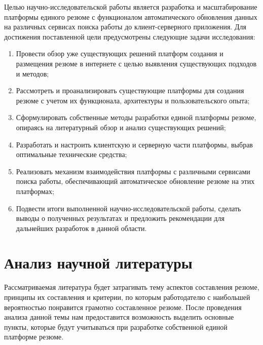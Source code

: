 \documentclass[master, och, diploma]{SCWorks}
\begin{document}
Целью научно-исследовательской работы является разработка и масштабирование платформы единого резюме с функционалом автоматического обновления данных на различных сервисах поиска работы до клиент-серверного приложения. Для достижения поставленной цели предусмотрены следующие задачи исследования:
\begin{enumerate}
    \item Провести обзор уже существующих решений платформ создания и      размещения резюме в интернете с целью выявления существующих  подходов и методов;
    \item Рассмотреть и проанализировать существующие платформы для создания резюме с учетом их функционала, архитектуры и пользовательского опыта;
    \item Сформулировать собственные методы разработки единой платформы резюме, опираясь на литературный обзор и анализ существующих решений;
    \item Разработать и настроить клиентскую и серверную части платформы, выбрав оптимальные технические средства;
    \item Реализовать механизм взаимодействия платформы с различными сервисами поиска работы, обеспечивающий автоматическое обновление резюме на этих платформах;
    \item Подвести итоги выполненной научно-исследовательской работы, сделать выводы о полученных результатах и предложить рекомендации для дальнейших разработок в данной области.
\end{enumerate}






\newpage
\section{Анализ научной литературы}
Рассматриваемая литература будет затрагивать тему аспектов составления резюме, принципы их составления и критерии, по которым работодателю с наибольшей вероятностью понравится грамотно составленное резюме. После проведения анализа данной темы нам предоставится возможность выделить основные пункты, которые будут учитываться при разработке собственной единой платформе резюме.
\end{document}
